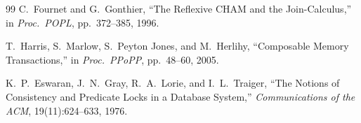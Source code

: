 \documentclass[11pt]{article}
\begin{document}
\begin{thebibliography}{99}
  C.~Fournet and G.~Gonthier,
  ``The Reflexive CHAM and the Join-Calculus,''
  in \emph{Proc.\ POPL}, pp.~372--385, 1996.

  T.~Harris, S.~Marlow, S.~Peyton Jones, and M.~Herlihy,
  ``Composable Memory Transactions,''
  in \emph{Proc.\ PPoPP}, pp.~48--60, 2005.

  K.~P.~Eswaran, J.~N.~Gray, R.~A.~Lorie, and I.~L.~Traiger,
  ``The Notions of Consistency and Predicate Locks in a Database System,''
  \emph{Communications of the ACM}, 19(11):624--633, 1976.
\end{thebibliography}
\end{document}
